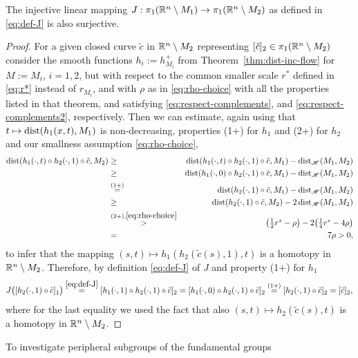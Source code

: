\begin{lemma}[$J$ is surjective]\label{lem:surjective}
The injective linear mapping $J:\pi_1(\mathbb{R}^n\setminus M_1)\to\pi_1(\mathbb{R}^n\setminus M_2)$ as
defined in \eqref{eq:def-J} is also surjective.
\end{lemma}
\begin{proof}
For a given closed curve $\tilde{c}$ in $\mathbb{R}^n\setminus M_2$ representing
$[\tilde{c}]_2\in\pi_1(\mathbb{R}^n\setminus M_2)$ consider the smooth functions $h_i:=
h_{M_i}^+$ from Theorem~\ref{thm:dist-inc-flow} for $M:= M_i$, $i=1,2$, 
but with respect to the common smaller scale $r^*$ defined
in \eqref{eq:r*} instead of $r_{M_i}$,
and with $\rho$ as in \eqref{eq:rho-choice} with all the 
properties listed in that theorem, and satisfying \eqref{eq:respect-complements},
and \eqref{eq:respect-complements2}, respectively.
Then we can estimate, again using that $t\mapsto\operatorname{dist}(h_1(x,t),M_1)$ 
is non-decreasing, properties (1+) for  $h_1$ and (2+) for $h_2$ and
our smallness assumption \eqref{eq:rho-choice}, 
\begin{eqnarray}\label{eq:dist-h1h2}
\operatorname{dist}(h_1(\cdot,t)\circ h_2(\cdot,1)\circ\tilde{c},M_2) & \ge &
\operatorname{dist}(h_1(\cdot,t)\circ h_2(\cdot,1)\circ\tilde{c},M_1)-\operatorname{dist}_{\mathscr{H}}(M_1,M_2)
\notag\\
&\ge &
\operatorname{dist}(h_1(\cdot,0)\circ h_2(\cdot,1)\circ\tilde{c},M_1)-\operatorname{dist}_{\mathscr{H}}(M_1,M_2)\notag\\
& \overset{\textnormal{(1+)}}{=} &
\operatorname{dist}(h_2(\cdot,1)\circ\tilde{c},M_1)-\operatorname{dist}_{\mathscr{H}}(M_1,M_2)\notag\\
&\ge &
\operatorname{dist}(h_2(\cdot,1)\circ\tilde{c},M_2)-2\operatorname{dist}_{\mathscr{H}}(M_1,M_2)\\
&\overset{\textnormal{(2+)},\eqref{eq:rho-choice}}{>} &
\textstyle \big(\frac12 r^*-\rho\big)-2\big(\frac14 r^*-4\rho
\big) \notag\\
& = & 7\rho > 0,\notag
\end{eqnarray}
to infer that the mapping $(s,t)\mapsto h_1(h_2(\tilde{c}(s),1),t)$
is a homotopy in $\mathbb{R}^n\setminus M_2$. Therefore, by definition \eqref{eq:def-J}
of $J$ and property (1+) for $h_1$
$$
J\big([h_2(\cdot,1)\circ\tilde{c}]_1\big)
\overset{\eqref{eq:def-J}}{=}  [h_1(\cdot,1)\circ h_2(\cdot,1)\circ\tilde{c}]_2
 =  [h_1(\cdot,0)\circ h_2(\cdot,1)\circ\tilde{c}]_2
\overset{\textnormal{(1+)}}{=} 
[h_2(\cdot,1)\circ\tilde{c}]_2=[\tilde{c}]_2,
$$
where for the last equality we used the fact that also $(s,t)\mapsto
h_2(\tilde{c}(s),t)$ is a homotopy in $\mathbb{R}^n\setminus M_2$.
\end{proof}
To investigate peripheral subgroups of the fundamental groups
